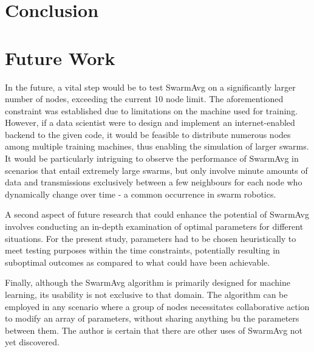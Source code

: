 \section{Conclusion}





\section{Future Work}
In the future, a vital step would be to test SwarmAvg on a significantly larger number of nodes, exceeding the current 10 node limit. The aforementioned constraint was established due to limitations on the machine used for training. However, if a data scientist were to design and implement an internet-enabled backend to the given code, it would be feasible to distribute numerous nodes among multiple training machines, thus enabling the simulation of larger swarms. It would be particularly intriguing to observe the performance of SwarmAvg in scenarios that entail extremely large swarms, but only involve minute amounts of data and transmissions exclusively between a few neighbours for each node who dynamically change over time - a common occurrence in swarm robotics.

A second aspect of future research that could enhance the potential of SwarmAvg involves conducting an in-depth examination of optimal parameters for different situations. For the present study, parameters had to be chosen heuristically to meet testing purposes within the time constraints, potentially resulting in suboptimal outcomes as compared to what could have been achievable.

Finally, although the SwarmAvg algorithm is primarily designed for machine learning, its usability is not exclusive to that domain. The algorithm can be employed in any scenario where a group of nodes necessitates collaborative action to modify an array of parameters, without sharing anything bu the parameters between them. The author is certain that there are other uses of SwarmAvg not yet discovered.